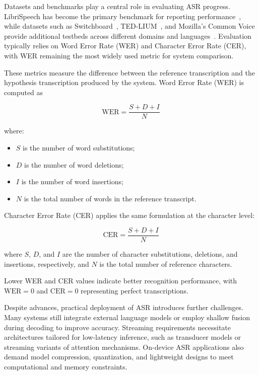Datasets and benchmarks play a central role in evaluating ASR progress. LibriSpeech has become the primary benchmark for reporting performance~\cite{panayotov2015librispeech}, while datasets such as Switchboard~\cite{switchboard1992}, TED-LIUM~\cite{rousseau2012tedlium}, and Mozilla's Common Voice provide additional testbeds across different domains and languages~\cite{ardila2020commonvoice}. Evaluation typically relies on Word Error Rate (WER) and Character Error Rate (CER), with WER remaining the most widely used metric for system comparison.

These metrics measure the difference between the reference transcription and the hypothesis transcription produced by the system. Word Error Rate (WER) is computed as

\begin{equation*}
    \text{WER} = \frac{S + D + I}{N}
    \label{eq:wer}
\end{equation*}

where:
\begin{itemize}
    \item $S$ is the number of word substitutions;
    \item $D$ is the number of word deletions;
    \item $I$ is the number of word insertions;
    \item $N$ is the total number of words in the reference transcript.
\end{itemize}

Character Error Rate (CER) applies the same formulation at the character level:

\begin{equation}
    \text{CER} = \frac{S + D + I}{N}
    \label{eq:cer}
\end{equation}

where $S$, $D$, and $I$ are the number of character substitutions, deletions, and insertions, respectively, and $N$ is the total number of reference characters.

Lower WER and CER values indicate better recognition performance, with $\text{WER} = 0$ and $\text{CER} = 0$ representing perfect transcriptions.

Despite advances, practical deployment of ASR introduces further challenges. Many systems still integrate external language models or employ shallow fusion during decoding to improve accuracy. Streaming requirements necessitate architectures tailored for low-latency inference, such as transducer models or streaming variants of attention mechanisms. On-device ASR applications also demand model compression, quantization, and lightweight designs to meet computational and memory constraints.

